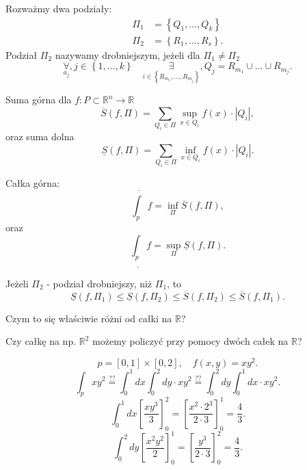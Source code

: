 \documentclass[../main.tex]{subfiles}
\begin{document}
\begin{definicja}
    Rozważmy dwa podziały:
    \begin{align*}
        \Pi_1 &= \left\{ Q_1, \ldots, Q_k \right\} \\
        \Pi_2 &= \left\{ R_1, \ldots, R_s \right\}
    .\end{align*}
    Podział $\Pi_2$ nazywamy drobniejszym, jeżeli dla $\Pi_1 \neq \Pi_2$
    \[
        \underset{a_j}{\forall}, j\in \left\{ 1, \ldots, k \right\}\quad \underset{i\in \left\{ R_{m_1}, \ldots, R_{m_j} \right\} }{\exists} , Q_j = R_{m_1}\cup \ldots \cup R_{m_j}
    .\]
\end{definicja}
\begin{definicja}
    Suma górna dla $f: P\subset \mathbb{R}^n \to \mathbb{R}$
     \[
         \overline{S}(f, \Pi) = \sum_{Q_i\in \Pi} \sup_{x\in Q_i} f(x) \cdot \left| Q_i \right|
     ,\]
 oraz suma dolna
 \[
     \underline{S}(f, \Pi) = \sum_{Q_i\in \Pi} \inf_{x\in Q_i} f(x) \cdot \left| Q_i \right|
 .\]
\end{definicja}
\begin{definicja}
    Całka górna:
    \[
        \overline{\int_{p}} f = \inf_{\Pi} \overline{S}(f, \Pi)
    ,\]
oraz
\[
    \underline{\int_{p}} f = \sup_{\Pi} \underline{S}(f, \Pi)
.\]
\end{definicja}
\begin{obserwacja}
   Jeżeli $\Pi_2$ - podział drobniejszy, niż $\Pi_1$, to
    \[
        \underline{S}(f, \Pi_1) \le \underline{S}(f, \Pi_2) \le \overline{S}(f, \Pi_2) \le \overline{S}(f, \Pi_1)
    .\]
\end{obserwacja}
\begin{pytanie}
    Czym to się właściwie różni od całki na $\mathbb{R}$?
\end{pytanie}
\begin{pytanie}
    Czy całkę na np. $\mathbb{R}^2$ możemy policzyć przy pomocy dwóch całek na $\mathbb{R}$?
\end{pytanie}
\begin{przyklad}
 \[
     p = \left[ 0,1 \right] \times \left[ 0,2 \right], \quad f(x,y) = xy^2
.\]
\[
    \int_{p} xy^2 \overset{\text{??}}{=}  \int_{0}^1 dx \int_0^2 dy\cdot  xy^2 \overset{\text{??}}{=} \int_0^2 dy \int_0^1 dx \cdot xy^2
.\]
\[
    \int_0^1dx\left[ \frac{xy^3}{3} \right]^2_0 = \left[ \frac{x^2\cdot 2^3}{2\cdot 3} \right]^1_0 = \frac{4}{3}
.\]
\[
    \int_0^2 dy \left[ \frac{x^2y^2}{2} \right]_0^1 = \left[\frac{y^3}{2\cdot 3}\right]_0^2 = \frac{4}{3}
.\]
\end{przyklad}
\end{document}
